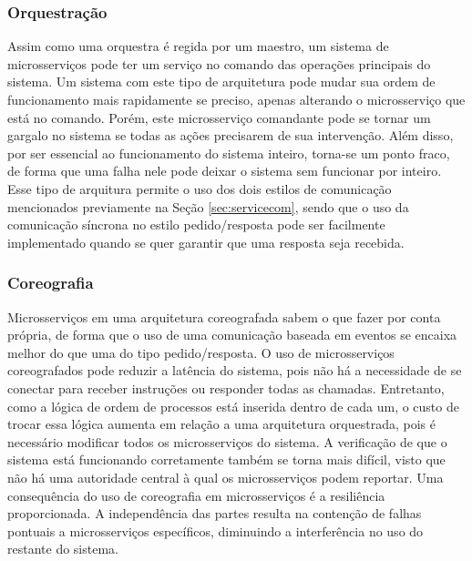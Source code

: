 \subsubsection{\textbf{Orquestração}} Assim como uma orquestra é regida por um maestro, um sistema de microsserviços pode ter um serviço no comando das operações principais do sistema. Um sistema com este tipo de arquitetura pode mudar sua ordem de funcionamento mais rapidamente se preciso, apenas alterando o microsserviço que está no comando. Porém, este microsserviço comandante pode se tornar um gargalo no sistema se todas as ações precisarem de sua intervenção. Além disso, por ser essencial ao funcionamento do sistema inteiro, torna-se um ponto fraco, de forma que uma falha nele pode deixar o sistema sem funcionar por inteiro. 
Esse tipo de arquitura permite o uso dos dois estilos de comunicação mencionados previamente na Seção \ref{sec:servicecom}, sendo que o uso da comunicação síncrona no estilo pedido/resposta pode ser facilmente implementado quando se quer garantir que uma resposta seja recebida. 

\subsubsection{\textbf{Coreografia}}
Microsserviços em uma arquitetura coreografada sabem o que fazer por conta própria, de forma que o uso de uma comunicação baseada em eventos se encaixa melhor do que uma do tipo pedido/resposta. O uso de microsserviços coreografados pode reduzir a latência do sistema, pois não há a necessidade de se conectar para receber instruções ou responder todas as chamadas. Entretanto, como a lógica de ordem de processos está inserida dentro de cada um, o custo de trocar essa lógica aumenta em relação a uma arquitetura orquestrada, pois é necessário modificar todos os microsserviços do sistema. A verificação de que o sistema está funcionando corretamente também se torna mais difícil, visto que não há uma autoridade central à qual os microsserviços podem reportar. Uma consequência do uso de coreografia em microsserviços é a resiliência proporcionada. A independência das partes resulta na contenção de falhas pontuais a microsserviços específicos, diminuindo a interferência no uso do restante do sistema.





